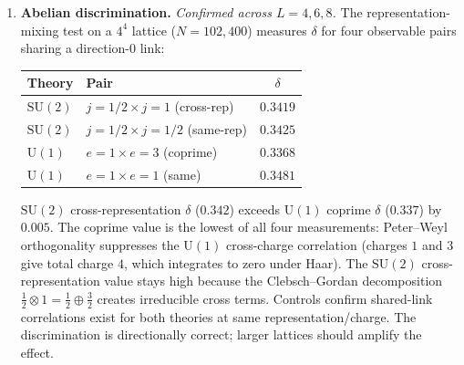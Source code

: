 \documentclass[11pt,a4paper]{article}
\theoremstyle{definition}
\theoremstyle{remark}
\newcommand{\SU}{\mathrm{SU}}
\begin{document}
\begin{enumerate}[nosep]
\emph{Self-evidence refinement.} Under self-evidence ($e=m^*$, $K_{\mathrm{self}}=0.094$, $[M,M]=0$): the Penrose residue response remains non-abelian ($\|[R_0,R_1]\|=0.056$), though reduced by a factor of~$6.9$ from the equilibrium value. The non-abelian curvature structure arises from the floor's eigenmode interference, not solely from the $m\neq e$ interaction. The confinement chain ($[M,E]\neq 0\Rightarrow$ area law) remains valid: Wilson loops require external evidence, but the Penrose curvature structure does not.

\emph{Algebraic status.} The ratio $|F^+_{\mathrm{corr}}|^2/\det(M^*)^2=42.00003$ is not exact ($42$ excluded at $1000$-digit precision; deviation invariant). The Penrose condensate $|F^+|^2=0.407$ has no PSLQ relation to framework constants up to degree~$30$. These quantities are transcendental, like the spectral gap itself.
\item \textbf{Abelian discrimination.} \emph{Confirmed across $L=4,6,8$.} The representation-mixing test on a $4^4$ lattice ($N=102{,}400$) measures $\delta$ for four observable pairs sharing a direction-$0$ link:

\begin{center}
\begin{tabular}{llc}
\toprule
Theory & Pair & $\delta$ \\
\midrule
$\SU(2)$ & $j\!=\!1/2 \times j\!=\!1$ (cross-rep) & $0.3419$ \\
$\SU(2)$ & $j\!=\!1/2 \times j\!=\!1/2$ (same-rep) & $0.3425$ \\
$\mathrm{U}(1)$ & $e\!=\!1 \times e\!=\!3$ (coprime) & $0.3368$ \\
$\mathrm{U}(1)$ & $e\!=\!1 \times e\!=\!1$ (same) & $0.3481$ \\
\bottomrule
\end{tabular}
\end{center}

$\SU(2)$ cross-representation $\delta$ ($0.342$) exceeds $\mathrm{U}(1)$ coprime $\delta$ ($0.337$) by $0.005$. The coprime value is the lowest of all four measurements: Peter--Weyl orthogonality suppresses the $\mathrm{U}(1)$ cross-charge correlation (charges $1$ and $3$ give total charge $4$, which integrates to zero under Haar). The $\SU(2)$ cross-representation value stays high because the Clebsch--Gordan decomposition $\frac{1}{2}\otimes 1=\frac{1}{2}\oplus\frac{3}{2}$ creates irreducible cross terms. Controls confirm shared-link correlations exist for both theories at same representation/charge. The discrimination is directionally correct; larger lattices should amplify the effect.
\end{enumerate}
\end{document}
